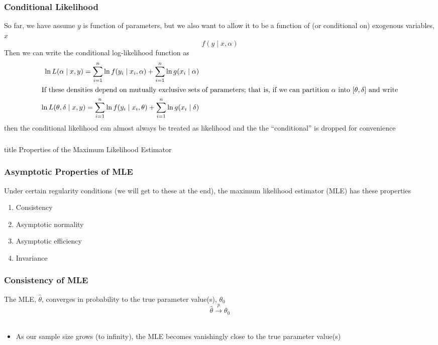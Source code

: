 \documentclass{beamer}
\begin{document}
\begin{frame}\frametitle{Conditional Likelihood}
    So far, we have assume $y$ is function of parameters, but we also want to allow it to be a function of (or conditional on) exogenous variables, $x$
    $$f(y \mid x, \alpha)$$
    Then we can write the conditional log-likelihood function as
    \begin{align*}
        \ln L(\alpha \mid x, y) = \sum_{i = 1}^n \ln f(y_i \mid x_i, \alpha) + \sum_{i = 1}^n \ln g(x_i \mid \alpha) \\
        \intertext{If these densities depend on mutually exclusive sets of parameters; that is, if we can partition $\alpha$ into $[\theta, \delta]$ and write}
        \ln L(\theta, \delta \mid x, y) = \sum_{i = 1}^n \ln f(y_i \mid x_i, \theta) + \sum_{i = 1}^n \ln g(x_i \mid \delta)
    \end{align*}
    then the conditional likelihood can almost always be treated as likelihood and the the ``conditional'' is dropped for convenience
\end{frame}

\begin{frame}\frametitle{}
    \vfill
    \centering
    \begin{beamercolorbox}[center]{title}
        \Large Properties of the Maximum Likelihood Estimator
    \end{beamercolorbox}
    \vfill
\end{frame}

\begin{frame}\frametitle{Asymptotic Properties of MLE}
    Under certain regularity conditions (we will get to these at the end), the maximum likelihood estimator (MLE) has these properties
    \begin{enumerate}
        \item Consistency
        \item Asymptotic normality
        \item Asymptotic efficiency
        \item Invariance
    \end{enumerate}
\end{frame}

\begin{frame}\frametitle{Consistency of MLE}
    The MLE, $\hat{\theta}$, converges in probability to the true parameter value(s), $\theta_0$
    $$\hat{\theta}\overset{p}{\rightarrow} \theta_0$$ \\
    \begin{itemize}
        \item As our sample size grows (to infinity), the MLE becomes vanishingly close to the true parameter value(s)
    \end{itemize}
\end{frame}
\end{document}
